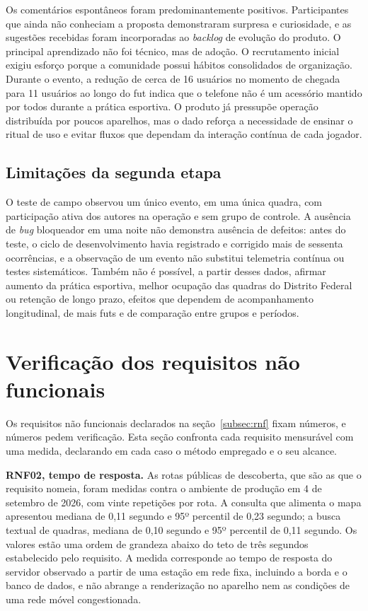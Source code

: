         Os comentários espontâneos foram predominantemente positivos. Participantes que ainda não conheciam a proposta demonstraram surpresa e curiosidade, e as sugestões recebidas foram incorporadas ao \textit{backlog} de evolução do produto. O principal aprendizado não foi técnico, mas de adoção. O recrutamento inicial exigiu esforço porque a comunidade possui hábitos consolidados de organização. Durante o evento, a redução de cerca de 16 usuários no momento de chegada para 11 usuários ao longo do fut indica que o telefone não é um acessório mantido por todos durante a prática esportiva. O produto já pressupõe operação distribuída por poucos aparelhos, mas o dado reforça a necessidade de ensinar o ritual de uso e evitar fluxos que dependam da interação contínua de cada jogador.

    \subsection{Limitações da segunda etapa}

        O teste de campo observou um único evento, em uma única quadra, com participação ativa dos autores na operação e sem grupo de controle. A ausência de \textit{bug} bloqueador em uma noite não demonstra ausência de defeitos: antes do teste, o ciclo de desenvolvimento havia registrado e corrigido mais de sessenta ocorrências, e a observação de um evento não substitui telemetria contínua ou testes sistemáticos. Também não é possível, a partir desses dados, afirmar aumento da prática esportiva, melhor ocupação das quadras do Distrito Federal ou retenção de longo prazo, efeitos que dependem de acompanhamento longitudinal, de mais futs e de comparação entre grupos e períodos.

\section{Verificação dos requisitos não funcionais}
    \label{sec:verificacao-rnf}

    Os requisitos não funcionais declarados na seção~\ref{subsec:rnf} fixam números, e números pedem verificação. Esta seção confronta cada requisito mensurável com uma medida, declarando em cada caso o método empregado e o seu alcance.

    \textbf{RNF02, tempo de resposta.} As rotas públicas de descoberta, que são as que o requisito nomeia, foram medidas contra o ambiente de produção em 4 de setembro de 2026, com vinte repetições por rota. A consulta que alimenta o mapa apresentou mediana de 0,11 segundo e 95º percentil de 0,23 segundo; a busca textual de quadras, mediana de 0,10 segundo e 95º percentil de 0,11 segundo. Os valores estão uma ordem de grandeza abaixo do teto de três segundos estabelecido pelo requisito. A medida corresponde ao tempo de resposta do servidor observado a partir de uma estação em rede fixa, incluindo a borda e o banco de dados, e não abrange a renderização no aparelho nem as condições de uma rede móvel congestionada.

